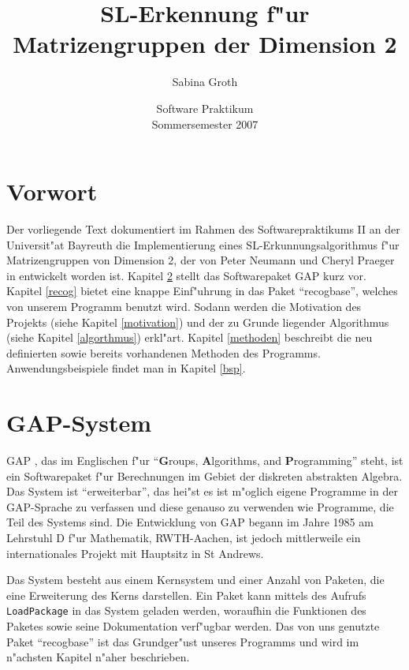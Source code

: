 \documentclass[a4paper,11pt]{article}
\title{\rm{SL}-Erkennung f"ur Matrizengruppen der Dimension 2}
\author{Sabina Groth}
\date{Software Praktikum \\ Sommersemester 2007}
\theoremstyle{bla}
\begin{document}
\maketitle

\tableofcontents


\section{Vorwort}

Der vorliegende Text dokumentiert im Rahmen des Softwarepraktikums II an der Universit"at Bayreuth die Implementierung eines \rm{SL}-Erkunnungsalgorithmus f"ur Matrizengruppen von Dimension 2, der von Peter Neumann und Cheryl Praeger in \cite{NP92} entwickelt worden ist. Kapitel \ref{gap} stellt das Softwarepaket GAP \cite{GAP} kurz vor. Kapitel \ref{recog} bietet eine knappe Einf"uhrung in das Paket "`recogbase"', welches von unserem Programm benutzt wird. Sodann werden die Motivation des Projekts (siehe Kapitel \ref{motivation}) und der zu Grunde liegender Algorithmus (siehe Kapitel \ref{algorthmus}) erkl"art. Kapitel \ref{methoden} beschreibt die neu definierten sowie bereits vorhandenen Methoden des Programms. Anwendungsbeispiele findet man in Kapitel \ref{bsp}.


\section{GAP-System}\label{gap}

GAP \cite{GAP}, das im Englischen f"ur "`\textbf{G}roups, \textbf{A}lgorithms, and \textbf{P}rogramming"' steht, ist ein Softwarepaket f"ur Berechnungen im Gebiet der diskreten abstrakten Algebra. Das System ist "`erweiterbar"', das hei"st es ist m"oglich eigene Programme in der GAP-Sprache zu verfassen und diese genauso zu verwenden wie Programme, die Teil des Systems sind. Die Entwicklung von GAP begann im Jahre 1985 am Lehrstuhl D f"ur Mathematik, RWTH-Aachen, ist jedoch mittlerweile ein internationales Projekt mit Hauptsitz in St Andrews.

Das System besteht aus einem Kernsystem und einer Anzahl von Paketen, die eine Erweiterung des Kerns darstellen. Ein Paket kann mittels des Aufrufs \texttt{LoadPackage} in das System geladen werden, woraufhin die Funktionen des Paketes sowie seine Dokumentation verf"ugbar werden.
Das von uns genutzte Paket "`recogbase"' ist das Grundger"ust unseres Programms und wird im n"achsten Kapitel n"aher beschrieben.
\end{document}

